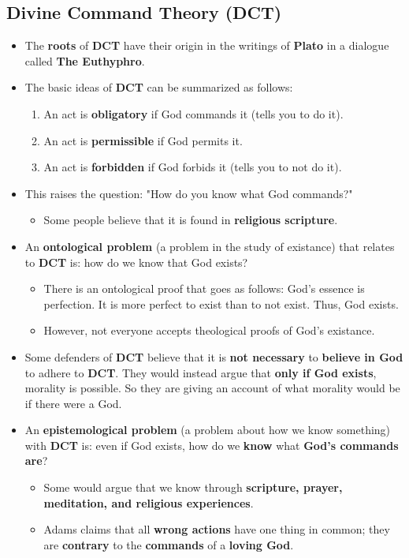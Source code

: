 \documentclass[16pt]{article}
\begin{document}
    \subsection*{Divine Command Theory (DCT)}
    \begin{itemize}
        \item The \textbf{roots} of \textbf{DCT} have their origin in the writings of \textbf{Plato} in a dialogue called \textbf{The Euthyphro}.
        \item The basic ideas of \textbf{DCT} can be summarized as follows: 
        \begin{enumerate}
            \item An act is \textbf{obligatory} if God commands it (tells you to do it).
            \item An act is \textbf{permissible} if God permits it.
            \item An act is \textbf{forbidden} if God forbids it (tells you to not do it).
        \end{enumerate}
        \item This raises the question: "How do you know what God commands?"
        \begin{itemize}
            \item Some people believe that it is found in \textbf{religious scripture}.
        \end{itemize}
        \item An \textbf{ontological problem} (a problem in the study of existance) that relates to \textbf{DCT} is: how do we know that God exists?
        \begin{itemize}
            \item There is an ontological proof that goes as follows: God's essence is perfection. It is more perfect to exist than to not exist. Thus, God exists.
            \item However, not everyone accepts theological proofs of God's existance.
        \end{itemize}
        \item Some defenders of \textbf{DCT} believe that it is \textbf{not necessary} to \textbf{believe in God} to adhere to \textbf{DCT}. They would instead argue that \textbf{only if God exists}, morality is possible. So they are giving an account of what morality would be if there were a God.
        \item An \textbf{epistemological problem} (a problem about how we know something) with \textbf{DCT} is: even if God exists, how do we \textbf{know} what \textbf{God's commands are}?
        \begin{itemize}
            \item Some would argue that we know through \textbf{scripture, prayer, meditation, and religious experiences}.
            \item Adams claims that all \textbf{wrong actions} have one thing in common; they are \textbf{contrary} to the \textbf{commands} of a \textbf{loving God}.
        \end{itemize}
    \end{itemize}
\end{document}

